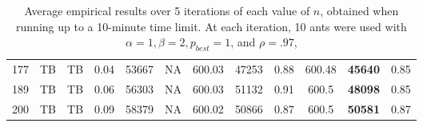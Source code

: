 \begin{table*}[]
\begin{tabular}{|c|cc|ccc|ccc|ccc|}
    177                  & TB                                       & TB                                        & 0.04                                   & 53667                                     & NA                                         & 600.03                                 & 47253                                     & 0.88                                       & 600.48                                 & \textbf{45640}                            & 0.85                  \\
    189                  & TB                                       & TB                                        & 0.06                                   & 56303                                     & NA                                         & 600.03                                 & 51132                                     & 0.91                                       & 600.5                                  & \textbf{48098}                            & 0.85                  \\
    200                  & TB                                       & TB                                        & 0.09                                   & 58379                                     & NA                                         & 600.02                                 & 50866                                     & 0.87                                       & 600.5                                  & \textbf{50581}                            & 0.87                  \\ \hline
    \end{tabular}
    \caption{\label{results-table}Average empirical results over 5 iterations 
    of each value of $n$, obtained when running up to a 10-minute time limit. At each
    iteration, 10 ants were used with $\alpha=1, \beta=2, p_{best}=1$, and $\rho=.97$, }
\end{table*}

